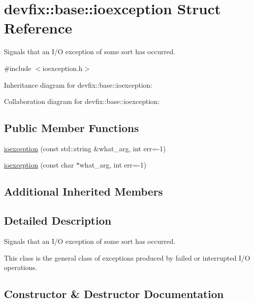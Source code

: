 \hypertarget{structdevfix_1_1base_1_1ioexception}{}\section{devfix\+:\+:base\+:\+:ioexception Struct Reference}
\label{structdevfix_1_1base_1_1ioexception}


Signals that an I/O exception of some sort has occurred.  




{\ttfamily \#include $<$ioexception.\+h$>$}



Inheritance diagram for devfix\+:\+:base\+:\+:ioexception\+:


Collaboration diagram for devfix\+:\+:base\+:\+:ioexception\+:
\subsection*{Public Member Functions}
\begin{DoxyCompactItemize}
\item 
\hyperlink{structdevfix_1_1base_1_1ioexception_af8daa140929da97ada76335bfb89ed66}{ioexception} (const std\+::string \&what\+\_\+arg, int err=-\/1)
\item 
\hyperlink{structdevfix_1_1base_1_1ioexception_a7e9cd8711bd28715fe16de909b750c33}{ioexception} (const char $\ast$what\+\_\+arg, int err=-\/1)
\end{DoxyCompactItemize}
\subsection*{Additional Inherited Members}


\subsection{Detailed Description}
Signals that an I/O exception of some sort has occurred. 

This class is the general class of exceptions produced by failed or interrupted I/O operations. 

\subsection{Constructor \& Destructor Documentation}
\mbox{\label{structdevfix_1_1base_1_1ioexception_af8daa140929da97ada76335bfb89ed66}} 
